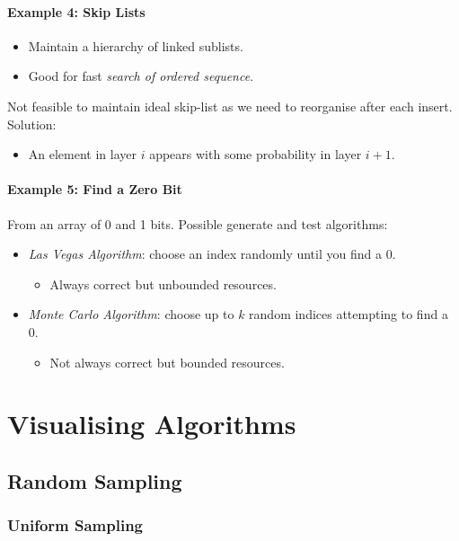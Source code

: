 \documentclass[twocolumn,english]{article}
\numberwithin{equation}{section}
\numberwithin{figure}{section}
\numberwithin{table}{section}
\begin{document}
\paragraph{Example 4: Skip Lists}
\begin{itemize}
\item Maintain a hierarchy of linked sublists.
\item Good for fast \emph{search of ordered sequence}.
\end{itemize}
Not feasible to maintain ideal skip-list as we need to reorganise
after each insert. Solution:
\begin{itemize}
\item An element in layer $i$ appears with some probability in layer $i+1$.
\end{itemize}

\paragraph{Example 5: Find a Zero Bit}

From an array of 0 and 1 bits. Possible generate and test algorithms:
\begin{itemize}
\item \emph{Las Vegas Algorithm}: choose an index randomly until you find
a 0.
\begin{itemize}
\item Always correct but unbounded resources.
\end{itemize}
\item \emph{Monte Carlo Algorithm}: choose up to $k$ random indices attempting
to find a 0.
\begin{itemize}
\item Not always correct but bounded resources.
\end{itemize}
\end{itemize}

\section{Visualising Algorithms}

\subsection{Random Sampling}

\subsubsection*{Uniform Sampling}
\end{document}

